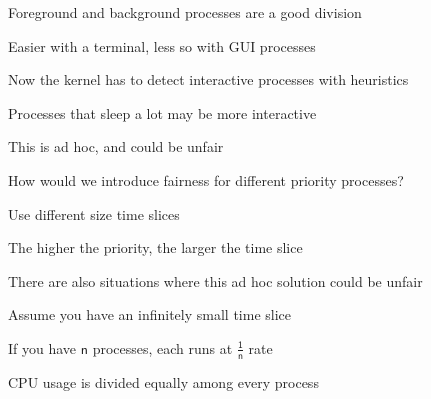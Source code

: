   \begin{slide}


    Foreground and background processes are a good division

    \leftspace{}Easier with a terminal, less so with GUI processes
    \medskip

    Now the kernel has to detect interactive processes with heuristics

    \leftspace{}Processes that sleep a lot may be more interactive

    \leftspace{}\leftspace{}This is ad hoc, and could be unfair
    \medskip

    How would we introduce fairness for different priority processes?

    \leftspace{}Use different size time slices

    \leftspace{}The higher the priority, the larger the time slice

    \leftspace{}\leftspace{}There are also situations where this ad hoc solution
    could be unfair

  \end{slide}

  \begin{slide}


    Assume you have an infinitely small time slice

    \leftspace{}If you have $\mathsf{n}$ processes, each runs at $\mathsf{\frac{1}{n}}$ rate
    \medskip

    \bigskip

    CPU usage is divided equally among every process

  \end{slide}

